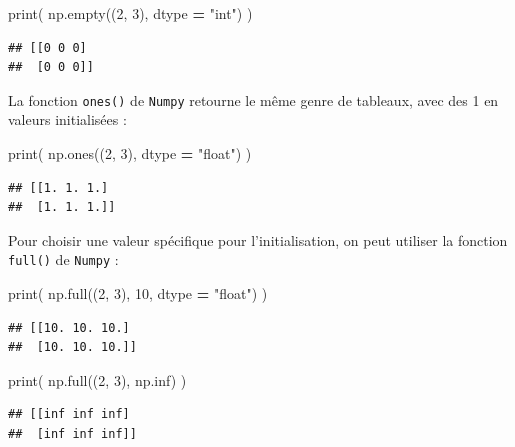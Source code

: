 \documentclass[
  12pt,
]{book}
\newenvironment{Shaded}{\begin{snugshade}}{\end{snugshade}}
\newcommand{\BuiltInTok}[1]{#1}
\newcommand{\DecValTok}[1]{\textcolor[rgb]{0.00,0.00,0.81}{#1}}
\newcommand{\NormalTok}[1]{#1}
\newcommand{\OperatorTok}[1]{\textcolor[rgb]{0.81,0.36,0.00}{\textbf{#1}}}
\newcommand{\StringTok}[1]{\textcolor[rgb]{0.31,0.60,0.02}{#1}}
\numberwithin{equation}{section}
\numberwithin{countremarque}{section}
\begin{document}
\begin{Shaded}
\begin{Highlighting}[]
\BuiltInTok{print}\NormalTok{( np.empty((}\DecValTok{2}\NormalTok{, }\DecValTok{3}\NormalTok{), dtype }\OperatorTok{=} \StringTok{"int"}\NormalTok{) )}
\end{Highlighting}
\end{Shaded}

\begin{lstlisting}
## [[0 0 0]
##  [0 0 0]]
\end{lstlisting}

La fonction \texttt{ones()} de \texttt{Numpy} retourne le même genre de tableaux, avec des 1 en valeurs initialisées :

\begin{Shaded}
\begin{Highlighting}[]
\BuiltInTok{print}\NormalTok{( np.ones((}\DecValTok{2}\NormalTok{, }\DecValTok{3}\NormalTok{), dtype }\OperatorTok{=} \StringTok{"float"}\NormalTok{) )}
\end{Highlighting}
\end{Shaded}

\begin{lstlisting}
## [[1. 1. 1.]
##  [1. 1. 1.]]
\end{lstlisting}

Pour choisir une valeur spécifique pour l'initialisation, on peut utiliser la fonction \texttt{full()} de \texttt{Numpy} :

\begin{Shaded}
\begin{Highlighting}[]
\BuiltInTok{print}\NormalTok{( np.full((}\DecValTok{2}\NormalTok{, }\DecValTok{3}\NormalTok{), }\DecValTok{10}\NormalTok{, dtype }\OperatorTok{=} \StringTok{"float"}\NormalTok{) )}
\end{Highlighting}
\end{Shaded}

\begin{lstlisting}
## [[10. 10. 10.]
##  [10. 10. 10.]]
\end{lstlisting}

\begin{Shaded}
\begin{Highlighting}[]
\BuiltInTok{print}\NormalTok{( np.full((}\DecValTok{2}\NormalTok{, }\DecValTok{3}\NormalTok{), np.inf) )}
\end{Highlighting}
\end{Shaded}

\begin{lstlisting}
## [[inf inf inf]
##  [inf inf inf]]
\end{lstlisting}
\end{document}
